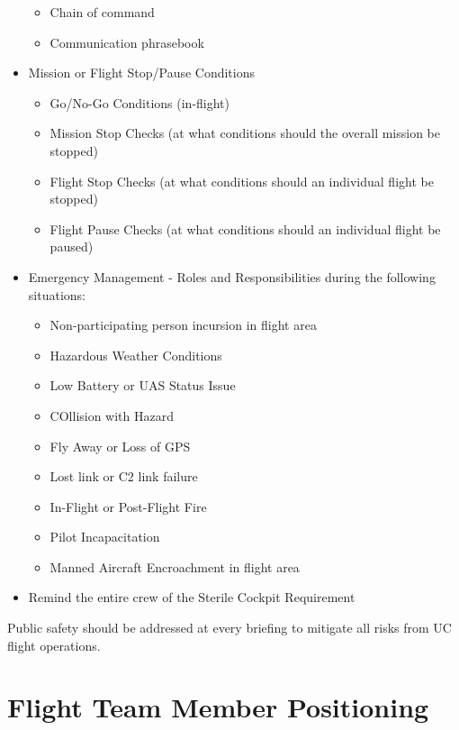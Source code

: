 \documentclass[
]{book}
\providecommand{\tightlist}{%
  \setlength{\itemsep}{0pt}\setlength{\parskip}{0pt}}
\begin{document}
\begin{itemize}
  \begin{itemize}
  \tightlist
  \item
    Chain of command
  \item
    Communication phrasebook
  \end{itemize}
\item
  Mission or Flight Stop/Pause Conditions

  \begin{itemize}
  \tightlist
  \item
    Go/No-Go Conditions (in-flight)
  \item
    Mission Stop Checks (at what conditions should the overall mission be stopped)
  \item
    Flight Stop Checks (at what conditions should an individual flight be stopped)
  \item
    Flight Pause Checks (at what conditions should an individual flight be paused)
  \end{itemize}
\item
  Emergency Management - Roles and Responsibilities during the following situations:

  \begin{itemize}
  \tightlist
  \item
    Non-participating person incursion in flight area
  \item
    Hazardous Weather Conditions
  \item
    Low Battery or UAS Status Issue
  \item
    COllision with Hazard
  \item
    Fly Away or Loss of GPS
  \item
    Lost link or C2 link failure
  \item
    In-Flight or Post-Flight Fire
  \item
    Pilot Incapacitation
  \item
    Manned Aircraft Encroachment in flight area
  \end{itemize}
\item
  Remind the entire crew of the Sterile Cockpit Requirement
\end{itemize}

Public safety should be addressed at every briefing to mitigate all risks from UC flight operations.

\section{Flight Team Member Positioning}\label{flight-team-member-positioning}
\end{document}
